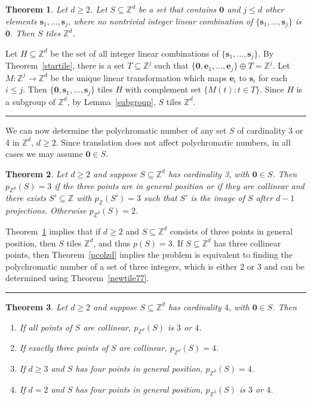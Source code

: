 \documentclass[12pt]{article}
\newenvironment{proof}{{\bf Proof:  }}{\hfill\rule{2mm}{2mm}}
\newtheorem{theorem}{Theorem}
\newcommand{\Z}{\ensuremath{\mathbb Z}}
\newcommand{\vect}[1]{\bm{#1}}
\begin{document}
\begin{theorem}\label{1tiled}
Let $d \ge  2$. Let $S\subseteq \Z^d$ be a set that contains $\vect{0}$ and $j \le d$ other elements $\vect{s}_1, \ldots, \vect{s}_j$, where no nontrivial integer linear combination of $\{\vect{s}_1, \ldots, \vect{s}_j\}$ is $\vect{0}$. Then $S$ tiles $\Z^d$.
\end{theorem}

\begin{proof}
Let $H\subseteq \Z^d$ be the set of all integer linear combinations of $\{\vect{s}_1, \ldots, \vect{s}_j\}$. By Theorem~\ref{startile}, there is a set $T\subseteq \Z^j$ such that $\{\vect{0},\vect{e}_1, \ldots, \vect{e}_j\} \oplus T = \Z^j$.  Let $M: \Z^j \rightarrow \Z^d$ be the unique linear transformation which maps $\vect{e}_i$ to $\vect{s}_i$ for each $i \le j$. Then $\{\vect{0}, \vect{s}_1, \ldots, \vect{s}_j\}$ tiles $H$ with complement set $\{M(t) : t \in T\}$.   Since $H$ is a subgroup of $\Z^d$, by Lemma~\ref{subgroup}, $S$ tiles $\Z^d$.
\end{proof}

We can now determine the polychromatic number of any set $S$ of cardinality 3 or 4 in $\Z^d$, $d \ge 2$. Since translation does not affect polychromatic numbers, in all cases we may assume $\vect{0} \in S$.

\begin{theorem}
Let $d \ge 2$ and suppose $S \subseteq \Z^d$ has cardinality 3, with $\vect{0} \in S$. Then $p_{\Z^d}(S) = 3$ if the three points are in general position or if they are collinear and there exists $S' \subseteq \Z$ with $p_{\Z}(S') = 3$ such that $S'$ is the image of $S$ after $d-1$ projections. Otherwise $p_{\Z^d}(S) = 2$.
\end{theorem}

\begin{proof}Theorem~\ref{1tiled} implies that if $d \ge 2$ and $S \subseteq \Z^d$ consists of three points in general position, then $S$ tiles $\Z^d$, and thus $p(S)=3$.  If $S \subseteq \Z^d$ has three collinear points, then Theorem~\ref{pcolzd} implies the problem is equivalent to finding the polychromatic number of a set of three integers, which is either 2 or 3 and can be determined using Theorem~\ref{newtile77}.
\end{proof}

\begin{theorem}
Let $d \ge 2$ and suppose $S \subseteq \Z^d$ has cardinality $4$, with $\vect{0} \in S$. Then
\begin{enumerate}
\item If all points of $S$ are collinear, $p_{\Z^d}(S)$ is $3$ or $4$.
\item If exactly three points of $S$ are collinear, $p_{\Z^d}(S)=4$.
\item If $d\ge 3$ and $S$ has four points in general position, $p_{\Z^d}(S)=4$.
\item If $d=2$ and $S$ has four points in general position, $p_{\Z^2}(S)$ is $3$ or $4$.
\end{enumerate}
\end{theorem}
\end{document}
